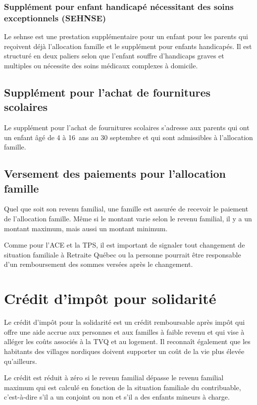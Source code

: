 \subsubsection{Supplément pour enfant handicapé nécessitant des soins exceptionnels (SEHNSE)}
Le \acrfull{sehnse} est une prestation supplémentaire pour un enfant pour les parents qui reçoivent déjà l'allocation famille et le supplément pour enfants handicapés. Il est structuré en deux paliers selon que l'enfant souffre d'handicaps graves et multiples ou nécessite des soins médicaux complexes à domicile.


\subsection{Supplément pour l'achat de fournitures scolaires}
Le supplément pour l'achat de fournitures scolaires s'adresse aux parents qui ont un enfant âgé de 4 à 16~ans au 30 septembre et qui sont admissibles à l'allocation famille.


\subsection{Versement des paiements pour l'allocation famille}
Quel que soit son revenu familial, une famille est assurée de recevoir le paiement de l'allocation famille. Même si le montant varie selon le revenu familial, il y a un montant maximum, mais aussi un montant minimum.

Comme pour l'ACE et la TPS, il est important de signaler tout changement de situation familiale à Retraite Québec ou la personne pourrait être responsable d'un remboursement des sommes versées après le changement.



\section{Crédit d'impôt pour solidarité}
\begin{intro}
	Le crédit d'impôt pour la solidarité est un crédit remboursable après impôt qui offre une aide accrue aux personnes et aux familles à faible revenu et qui vise à alléger les coûts associés à la TVQ et au logement. Il reconnaît également que les habitants des villages nordiques doivent supporter un coût de la vie plus élevée qu'ailleurs.
	
	Le crédit est réduit à zéro si le revenu familial dépasse le revenu familial maximum qui est calculé en fonction de la situation familiale du contribuable, c'est-à-dire s'il a un conjoint ou non et s'il a des enfants mineurs à charge.
\end{intro}

